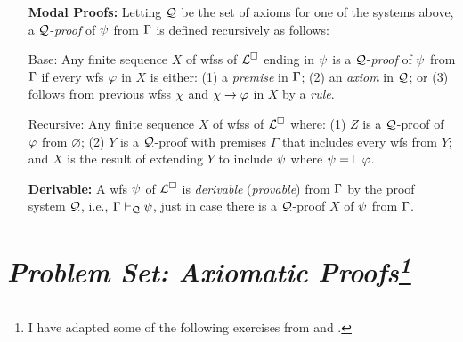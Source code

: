 \documentclass[a4paper, 11pt]{article} %
\begin{document}
\begin{enumerate}[leftmargin=1.2in,itemsep=2pt]
    \vspace{-.1in}
  \item[\bf Modal Proofs:] Letting $\mathcal{Q}$ be the set of axioms for one of the systems above, a $\mathcal{Q}$-\textit{proof} of $\psi$ from $\Gamma$ is defined recursively as follows:
    \item[\sc Base:] Any finite sequence $X$ of wfss of $\mathcal{L}^{\square}$ ending in $\psi$ is a $\mathcal{Q}$-\textit{proof} of $\psi$ from $\Gamma$ if every wfs $\varphi$ in $X$ is either: (1) a \textit{premise} in $\Gamma$; (2) an \textit{axiom} in $\mathcal{Q}$; or (3) follows from previous wfss $\chi$ and $\chi \rightarrow \varphi$ in $X$ by a \textit{rule}.
    \item[\sc Recursive:] Any finite sequence $X$ of wfss of $\mathcal{L}^{\square}$ where: (1) $Z$ is a $\mathcal{Q}$-proof of $\varphi$ from $\varnothing$; (2) $Y$ is a $\mathcal{Q}$-proof with premises $\Gamma$ that includes every wfs from $Y$; and $X$ is the result of extending $Y$ to include $\psi$ where $\psi = \Box\varphi$.
	\item[\bf Derivable:] A wfs $\psi$ of $\mathcal{L}^{\square}$ is \textit{derivable} (\textit{provable}) from $\Gamma$ by the proof system $\mathcal{Q}$, i.e., $\Gamma \vdash_{\mathcal{Q}} \psi$, just in case there is a $\mathcal{Q}$-proof $X$ of $\psi$ from $\Gamma$.
\end{enumerate}




\section*{\it Problem Set: Axiomatic Proofs\footnote{I have adapted some of the following exercises from \citet{Studd2016} and \citet{Sider2010}.}}
\end{document}
